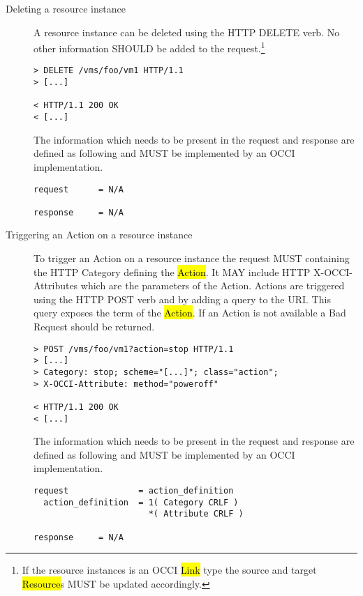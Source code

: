 \documentclass[10pt,a4paper]{article}
\begin{document}
\begin{description}
  \item[Deleting a resource instance] A resource instance can be
    deleted using the HTTP DELETE verb. No other information SHOULD be
    added to the request.\footnote{If the resource instances is an
      OCCI \hl{Link} type the source and target \hl{Resource}s MUST be
      updated accordingly.}

\begin{verbatim}
> DELETE /vms/foo/vm1 HTTP/1.1
> [...]

< HTTP/1.1 200 OK
< [...]
\end{verbatim}

    The information which needs to be present in the request and
    response are defined as following and MUST be implemented by an
    OCCI implementation.

\begin{verbatim}
request      = N/A

response     = N/A
\end{verbatim}

  \item[Triggering an Action on a resource instance] To trigger an
    Action on a resource instance the request MUST containing the HTTP
    Category defining the \hl{Action}. It MAY include HTTP
    X-OCCI-Attributes which are the parameters of the Action. Actions
    are triggered using the HTTP POST verb and by adding a query to
    the URI. This query exposes the term of the \hl{Action}. If an
    Action is not available a Bad Request should be returned.

\begin{verbatim}
> POST /vms/foo/vm1?action=stop HTTP/1.1
> [...]
> Category: stop; scheme="[...]"; class="action";
> X-OCCI-Attribute: method="poweroff"

< HTTP/1.1 200 OK
< [...]
\end{verbatim}

    The information which needs to be present in the request and
    response are defined as following and MUST be implemented by an
    OCCI implementation.

\begin{verbatim}
request              = action_definition
  action_definition  = 1( Category CRLF )
                       *( Attribute CRLF )

response     = N/A
\end{verbatim}

\end{description}
\end{document}

